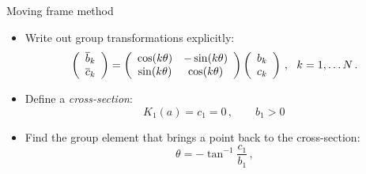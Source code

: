 \documentclass{beamer}
\begin{document}
 

% 

\begin{frame}{Moving frame method}
  \begin{block}{}
	\begin{itemize}
	\item Write out group transformations explicitly:
	\[
	 \left(\barr{cc} \overline{b}_k \\ \overline{c}_k\earr \right)=\left(\barr{cc}
			    			\cos(k\theta) & -\sin(k\theta)\\
						\sin(k\theta) & \cos(k\theta)\\
			   			\earr	
						\right)\left(\barr{cc} b_k \\ c_k\earr\right)\,,\ \ k=1,\ldots N\,.
	\]
	\item Define a \emph{cross-section}:
	\[
 		K_1(a)=c_1=0\,,\qquad b_1>0\,
	\]
	\item Find the group element that brings a point back to the cross-section:
	\[
		\theta=-\tan^{-1}\frac{c_1}{b_1}\,,	
	\]
	\end{itemize}
  \end{block}
\end{frame}
\end{document}

